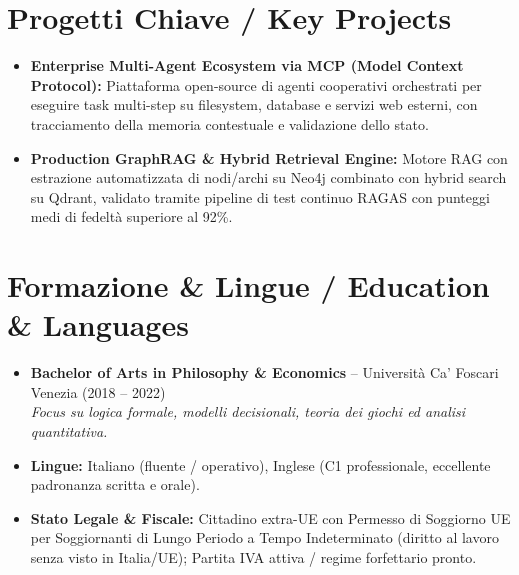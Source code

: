 \documentclass[a4paper,10pt]{article}
\begin{document}
\section{Progetti Chiave / Key Projects}
\begin{itemize}
  \item \textbf{Enterprise Multi-Agent Ecosystem via MCP (Model Context Protocol):} Piattaforma open-source di agenti cooperativi orchestrati per eseguire task multi-step su filesystem, database e servizi web esterni, con tracciamento della memoria contestuale e validazione dello stato.
  \item \textbf{Production GraphRAG \& Hybrid Retrieval Engine:} Motore RAG con estrazione automatizzata di nodi/archi su Neo4j combinato con hybrid search su Qdrant, validato tramite pipeline di test continuo RAGAS con punteggi medi di fedeltà superiore al 92\%.
\end{itemize}

\section{Formazione \& Lingue / Education \& Languages}
\begin{itemize}
  \item \textbf{Bachelor of Arts in Philosophy \& Economics} -- Università Ca' Foscari Venezia (2018 -- 2022) \\
  \textit{Focus su logica formale, modelli decisionali, teoria dei giochi ed analisi quantitativa.}
  \item \textbf{Lingue:} Italiano (fluente / operativo), Inglese (C1 professionale, eccellente padronanza scritta e orale).
  \item \textbf{Stato Legale \& Fiscale:} Cittadino extra-UE con Permesso di Soggiorno UE per Soggiornanti di Lungo Periodo a Tempo Indeterminato (diritto al lavoro senza visto in Italia/UE); Partita IVA attiva / regime forfettario pronto.
\end{itemize}
\end{document}
